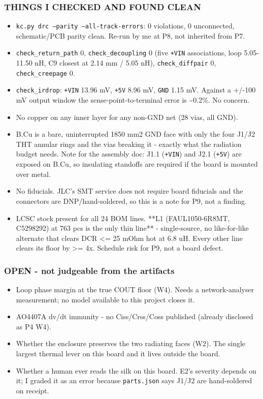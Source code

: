 \documentclass[11pt,a4paper]{article}
\begin{document}
\subsubsection*{THINGS I CHECKED AND FOUND CLEAN}
\begin{itemize}
\item \texttt{kc.py drc --parity --all-track-errors}: 0 violations, 0 unconnected, schematic/PCB
parity clean. Re-run by me at P8, not inherited from P7.
\item \texttt{check\_return\_path} 0, \texttt{check\_decoupling} 0 (five \texttt{+VIN} associations, loop 5.05-11.50 nH,
C9 closest at 2.14 mm / 5.05 nH), \texttt{check\_diffpair} 0, \texttt{check\_creepage} 0.
\item \texttt{check\_irdrop}: \texttt{+VIN} 13.96 mV, \texttt{+5V} 8.96 mV, \texttt{GND} 1.15 mV. Against a +/-100 mV
output window the sense-point-to-terminal error is \textasciitilde{}0.2\%. No concern.
\item No copper on any inner layer for any non-GND net (28 vias, all GND).
\item B.Cu is a bare, uninterrupted 1850 mm2 GND face with only the four J1/J2 THT annular
rings and the vias breaking it - exactly what the radiation budget needs. Note for the
assembly doc: J1.1 (\texttt{+VIN}) and J2.1 (\texttt{+5V}) are exposed on B.Cu, so insulating
standoffs are required if the board is mounted over metal.
\item No fiducials. JLC's SMT service does not require board fiducials and the connectors are
DNP/hand-soldered, so this is a note for P9, not a finding.
\item LCSC stock present for all 24 BOM lines. {*}{*}L1 (FAUL1050-6R8MT, C5298292) at 763 pcs is
the only thin line{*}{*} - single-source, no like-for-like alternate that clears
DCR \textless{}= 25 mOhm hot at 6.8 uH. Every other line clears its floor by \textgreater{}= 4x. Schedule
risk for P9, not a board defect.
\end{itemize}
\subsubsection*{OPEN - not judgeable from the artifacts}
\begin{itemize}
\item Loop phase margin at the true COUT floor (W4). Needs a network-analyser measurement;
no model available to this project closes it.
\item AO4407A dv/dt immunity - no Ciss/Crss/Coss published (already disclosed as P4 W4).
\item Whether the enclosure preserves the two radiating faces (W2). The single largest
thermal lever on this board and it lives outside the board.
\item Whether a human ever reads the silk on this board. E2's severity depends on it; I
graded it as an error because \texttt{parts.json} says J1/J2 are hand-soldered on receipt.
\end{itemize}
\end{document}
